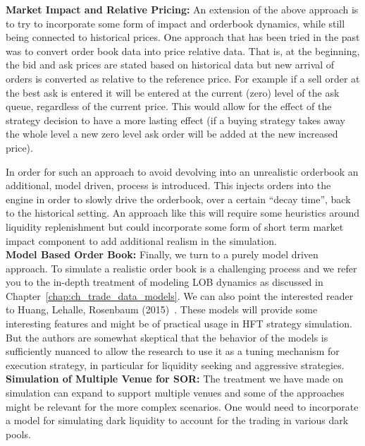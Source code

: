\noindent\textbf{Market Impact and Relative Pricing:} An extension of the above approach is to try to incorporate some form of impact and orderbook dynamics, while still being connected to historical prices. One approach that has been tried in the past was to convert order book data into price relative data. That is, at the beginning, the bid and ask prices are stated based on historical data but new arrival of orders is converted as relative to the reference price. For example if a sell order at the best ask is entered it will be entered at the current (zero) level of the ask queue, regardless of the current price. This would allow for the effect of the strategy decision to have a more lasting effect (if a buying strategy takes away the whole level a new zero level ask order will be added at the new increased price). 


In order for such an approach to avoid devolving into an unrealistic orderbook an additional, model driven, process is introduced. This injects orders into the engine in order to slowly drive the orderbook, over a certain ``decay time'', back to the historical setting. An approach like this will require some heuristics around liquidity replenishment but could incorporate some form of short term market impact component to add additional realism in the simulation. \\


\noindent\textbf{Model Based Order Book:} Finally, we turn to a purely model driven approach. To simulate a realistic order book is a challenging process and we refer you to the in-depth treatment of modeling LOB dynamics as discussed in Chapter~\ref{chap:ch_trade_data_models}. We can also point the interested reader to Huang, Lehalle, Rosenbaum (2015)~\cite{hlehros}. These models will provide some interesting features and might be of practical usage in HFT strategy simulation. But the authors are somewhat skeptical that the behavior of the models is sufficiently nuanced to allow the research to use it as a tuning mechanism for execution strategy, in particular for liquidity seeking and aggressive strategies. \\


\noindent\textbf{Simulation of Multiple Venue for SOR:} The treatment we have made on simulation can expand to support multiple venues and some of the approaches might be relevant for the more complex scenarios. One would need to incorporate a model for simulating dark liquidity to account for the trading in various dark pools. \\ 


